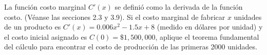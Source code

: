 \item La función costo marginal $C'(x)$ se definió como la derivada de la función costo. (Véanse las secciones 2.3 y 3.9). Si el costo marginal de fabricar $x$ unidades de un producto es $C'(x) = 0.006x^2 - 1.5x + 8$ (medido en dólares por unidad) y el costo inicial asignado es $C(0) = \$1,500,000$, aplique el teorema fundamental del cálculo para encontrar el costo de producción de las primeras 2000 unidades.
